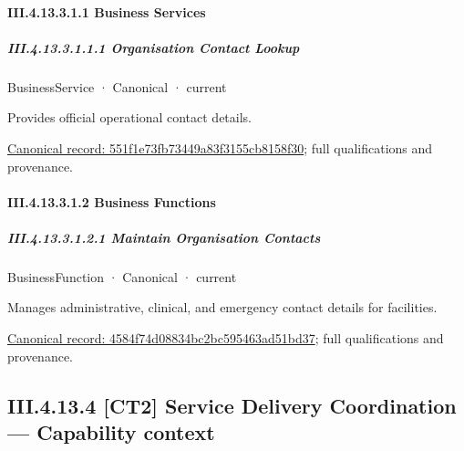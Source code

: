 \paragraph*{III.4.13.3.1.1 Business Services}
\label{navigation:III.4.13.3.1.1}

\subparagraph*{III.4.13.3.1.1.1 Organisation Contact Lookup}
\label{navigation:III.4.13.3.1.1.1}

\label{element:551f1e73fb73449a83f3155cb8158f30}
{\small BusinessService · Canonical · current}\par

Provides official operational contact details.


{\footnotesize \href{../../../../../../../../continuum/business/business-service/551f1e73fb73449a83f3155cb8158f30.md}{Canonical record: 551f1e73fb73449a83f3155cb8158f30}; full qualifications and provenance.}\par
\paragraph*{III.4.13.3.1.2 Business Functions}
\label{navigation:III.4.13.3.1.2}

\subparagraph*{III.4.13.3.1.2.1 Maintain Organisation Contacts}
\label{navigation:III.4.13.3.1.2.1}

\label{element:4584f74d08834bc2bc595463ad51bd37}
{\small BusinessFunction · Canonical · current}\par

Manages administrative, clinical, and emergency contact details for facilities.


{\footnotesize \href{../../../../../../../../continuum/business/business-function/4584f74d08834bc2bc595463ad51bd37.md}{Canonical record: 4584f74d08834bc2bc595463ad51bd37}; full qualifications and provenance.}\par
\subsection*{III.4.13.4 [CT2] Service Delivery Coordination — Capability context}
\label{navigation:III.4.13.4}

